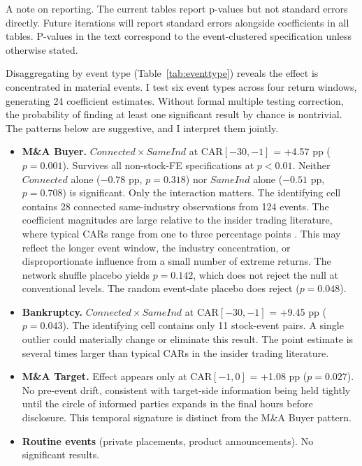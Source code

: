 \documentclass[12pt]{article}
\begin{document}
A note on reporting. The current tables report p-values but not standard errors directly. Future iterations will report standard errors alongside coefficients in all tables. P-values in the text correspond to the event-clustered specification unless otherwise stated.

Disaggregating by event type (Table~\ref{tab:eventtype}) reveals the effect is concentrated in material events. I test six event types across four return windows, generating 24 coefficient estimates. Without formal multiple testing correction, the probability of finding at least one significant result by chance is nontrivial. The patterns below are suggestive, and I interpret them jointly.

\begin{itemize}
\item \textbf{M\&A Buyer.} $Connected \times SameInd$ at CAR$[-30,-1]$ = +4.57 pp ($p=0.001$). Survives all non-stock-FE specifications at $p<0.01$. Neither $Connected$ alone ($-0.78$ pp, $p=0.318$) nor $SameInd$ alone ($-0.51$ pp, $p=0.708$) is significant. Only the interaction matters. The identifying cell contains 28 connected same-industry observations from 124 events. The coefficient magnitudes are large relative to the insider trading literature, where typical CARs range from one to three percentage points \cite{ahern2017information}. This may reflect the longer event window, the industry concentration, or disproportionate influence from a small number of extreme returns. The network shuffle placebo yields $p=0.142$, which does not reject the null at conventional levels. The random event-date placebo does reject ($p=0.048$).
\item \textbf{Bankruptcy.} $Connected \times SameInd$ at CAR$[-30,-1]$ = +9.45 pp ($p=0.043$). The identifying cell contains only 11 stock-event pairs. A single outlier could materially change or eliminate this result. The point estimate is several times larger than typical CARs in the insider trading literature.
\item \textbf{M\&A Target.} Effect appears only at CAR$[-1,0]$ = +1.08 pp ($p=0.027$). No pre-event drift, consistent with target-side information being held tightly until the circle of informed parties expands in the final hours before disclosure. This temporal signature is distinct from the M\&A Buyer pattern.
\item \textbf{Routine events} (private placements, product announcements). No significant results.
\end{itemize}
\end{document}
